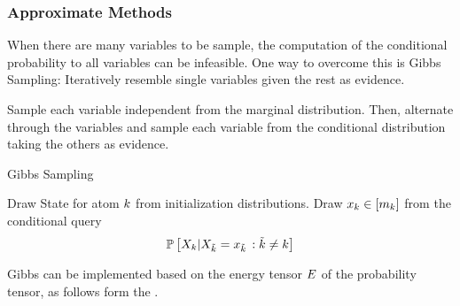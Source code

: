 \subsubsection{Approximate Methods}

When there are many variables to be sample, the computation of the conditional probability to all variables can be infeasible.
One way to overcome this is Gibbs Sampling: Iteratively resemble single variables given the rest as evidence.


Sample each variable independent from the marginal distribution.
Then, alternate through the variables and sample each variable from the conditional distribution taking the others as evidence.

\begin{algorithm}[hbt!]
\caption{Gibbs Sampling}\label{alg:Gibbs}
\begin{algorithmic}
\For{$\catenumeratorin$}
	\State Draw State for atom $k$ from initialization distributions. %
\EndFor
{}
\For{$\catenumeratorin$}
	\State Draw $x_{k}\in[m_{k}]$ from the conditional query
		\[ \mathbb{P}\left[X_{k}|X_{\tilde{k}}=x_{\tilde{k}}\, : \tilde{k} \neq k\right] \]
\EndFor
\EndWhile
\end{algorithmic}
\end{algorithm}



Gibbs can be implemented based on the energy tensor $E$ of the probability tensor, as follows form the .



	



